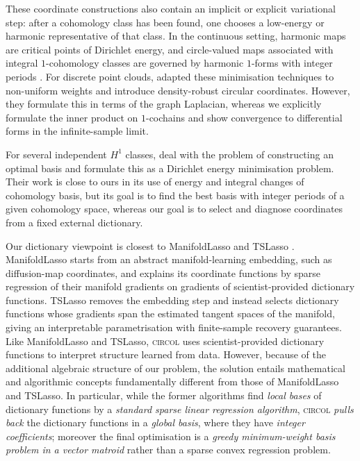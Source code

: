 \documentclass[a4paper,11pt, DIV=10]{scrartcl}
\numberwithin{equation}{section}
\theoremstyle{definition}
\theoremstyle{remark}
\begin{document}
These coordinate constructions also contain an implicit or explicit variational step: after a cohomology class has been found, one chooses a low-energy or harmonic representative of that class.
In the continuous setting, harmonic maps are critical points of Dirichlet energy, and circle-valued maps associated with integral $1$-cohomology classes are governed by harmonic $1$-forms with integer periods \cite{baird2003harmonic,helein2008harmonic}.
For discrete point clouds, \cite{paik2023circular} adapted these minimisation techniques to non-uniform weights and introduce density-robust circular coordinates.
However, they formulate this in terms of the graph Laplacian, whereas we explicitly formulate the inner product on $1$-cochains and show convergence to differential forms in the infinite-sample limit.

For several independent $H^1$ classes, \cite{scoccola2023toroidal} deal with the problem of constructing an optimal basis and formulate this as a Dirichlet energy minimisation problem.
Their work is close to ours in its use of energy and integral changes of cohomology basis, but its goal is to find the best basis with integer periods of a given cohomology space, whereas our goal is to select and diagnose coordinates from a fixed external dictionary.

Our dictionary viewpoint is closest to ManifoldLasso and
TSLasso \cite{koelle2022manifold,koelle2024consistency}.
ManifoldLasso starts from an abstract manifold-learning embedding,
such as diffusion-map coordinates, and explains its coordinate
functions by sparse regression of their manifold gradients on
gradients of scientist-provided dictionary functions.  TSLasso removes
the embedding step and instead selects dictionary functions whose
gradients span the estimated tangent spaces of the manifold, giving an
interpretable parametrisation with finite-sample recovery guarantees.
Like ManifoldLasso and TSLasso, \textsc{circol} uses
scientist-provided dictionary functions to interpret structure learned
from data.
However, because of the additional algebraic structure of our problem, the solution entails mathematical and algorithmic concepts fundamentally different from those of ManifoldLasso and TSLasso. In particular, while the former algorithms find {\em local bases} of dictionary functions by a {\em standard sparse linear regression algorithm}, \textsc{circol} {\em pulls back} the dictionary functions in a {\em global basis}, where they have {\em integer coefficients}; moreover
the final optimisation is a {\em greedy minimum-weight basis problem in a
vector matroid} rather than a sparse convex regression problem.
\end{document}
